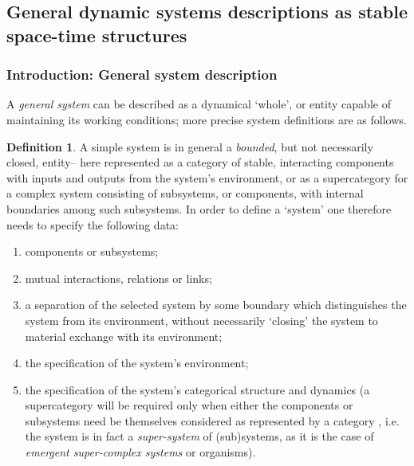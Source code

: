 \documentclass[12pt]{article}
\theoremstyle{plain}
\theoremstyle{definition}
\newtheorem{definition}{Definition}[section]
\numberwithin{equation}{section}
\begin{document}
\subsection{General dynamic systems descriptions as stable space-time structures}

\subsubsection{Introduction: General system description}
A \emph{general system} can be described as a dynamical `whole', or entity capable of maintaining its working conditions; more precise system definitions are as follows. 

\begin{definition} 

 A simple system is in general a \emph{bounded}, but not necessarily closed, entity-- here represented as a category of stable, interacting components with inputs and outputs from the system's environment, or as a supercategory for a complex system consisting of subsystems, or components, with internal boundaries among such subsystems. In order to define a `system' one therefore needs to specify the following data: 

\begin{enumerate}
\item components or subsystems;
\item mutual interactions, relations or links; 
\item a separation of the selected system by some boundary which distinguishes the system from its environment, without necessarily `closing' the system to material exchange with its environment;
\item the specification of the system's environment;  
\item the specification of the system's categorical structure and dynamics 
(a supercategory will be required only when either the components or subsystems need be themselves considered as represented by a category , i.e. the system is in fact a \emph{super-system} of (sub)systems, as it is the case of \emph{emergent super-complex systems} or organisms).
\end{enumerate}
\end{definition}
\end{document}
